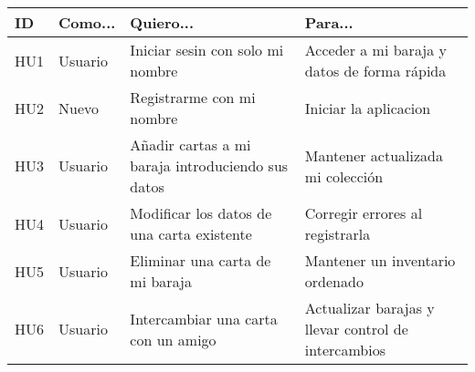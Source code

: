 \documentclass[12pt]{article}
\begin{document}
\begin{tabular}{|p{1.2cm}|p{3.8cm}|p{6cm}|p{3cm}|}
\hline
\textbf{ID} & \textbf{Como...} & \textbf{Quiero...} & \textbf{Para...} \\
\hline
HU1 & Usuario & Iniciar sesin con solo mi nombre & Acceder a mi baraja y datos de forma rápida \\
\hline
HU2 & Nuevo & Registrarme con mi nombre & Iniciar la aplicacion  \\
\hline
HU3 & Usuario & Añadir cartas a mi baraja introduciendo sus datos & Mantener actualizada mi colección \\
\hline
HU4 & Usuario & Modificar los datos de una carta existente & Corregir errores al registrarla \\
\hline
HU5 & Usuario & Eliminar una carta de mi baraja  & Mantener un inventario ordenado \\
\hline
HU6 & Usuario & Intercambiar una carta con un amigo & Actualizar  barajas y llevar control de intercambios \\
\hline
\end{tabular}
\end{document}

